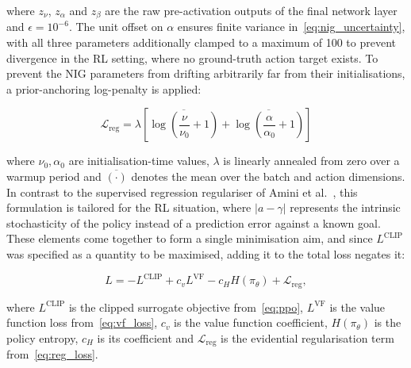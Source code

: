\documentclass{sig-alternate}
\begin{document}
\noindent where $z_\nu$, $z_\alpha$ and $z_\beta$ are the raw pre-activation outputs of the final network layer and $\epsilon = 10^{-6}$. The unit offset on $\alpha$ ensures finite variance in~\cref{eq:nig_uncertainty}, with all three parameters additionally clamped to a maximum of 100 to prevent divergence in the RL setting, where no ground-truth action target exists. To prevent the NIG parameters from drifting arbitrarily far from their initialisations, a prior-anchoring log-penalty is applied:

\begin{equation}
    \mathcal{L}_{\text{reg}} = \lambda \left[ \overline{\log\!\left(\frac{\nu}{\nu_0} + 1\right)} + \overline{\log\!\left(\frac{\alpha}{\alpha_0} + 1\right)} \right]
    \label{eq:reg_loss}
\end{equation}

\noindent where $\nu_0, \alpha_0$ are initialisation-time values, $\lambda$ is linearly annealed from zero over a warmup period and $\overline{(\cdot)}$ denotes the mean over the batch and action dimensions. In contrast to the supervised regression regulariser of Amini et al.~\cite{amini2020deep}, this formulation is tailored for the RL situation, where $|a - \gamma|$ represents the intrinsic stochasticity of the policy instead of a prediction error against a known goal. These elements come together to form a single minimisation aim, and since $L^{\text{CLIP}}$ was specified as a quantity to be maximised, adding it to the total loss negates it:

\begin{equation}
    L = -L^{\text{CLIP}} + c_v L^{\text{VF}} - c_H H(\pi_\theta) + \mathcal{L}_{\text{reg}},
    \label{eq:total_loss}
\end{equation}

\noindent where $L^{\text{CLIP}}$ is the clipped surrogate objective from~\cref{eq:ppo}, $L^{\text{VF}}$ is the value function loss from~\cref{eq:vf_loss}, $c_v$ is the value function coefficient, $H(\pi_\theta)$ is the policy entropy, $c_H$ is its coefficient and $\mathcal{L}_{\text{reg}}$ is the evidential regularisation term from~\cref{eq:reg_loss}.
\end{document}
